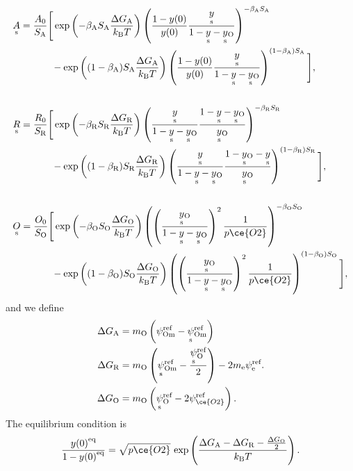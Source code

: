 \documentclass{article}
\numberwithin{equation}{section}
\newcommand{\us}[1]{\underset{\textrm{s}}{#1}{}}
\def\kB{k_\mathrm{B}}
\def\Ox{\mathrm{O}}
\newcommand{\OO}{{\ce{O2}}}
\def\ys{\us y}
\def\y0{{y(0)}}
\def\yOs{{\us y_\textrm{O}}}
\def\pO2{{p\OO}}
\def\A0{A_0}
\def\R0{R_0}
\def\K0{O_0}
\def\DGA{\Delta G_\textrm{A}  }
\def\DGR{\Delta G_\textrm{R}  }
\def\DGO{\Delta G_\textrm{O}  }
\def\betaA{\beta_\textrm{A}}
\def\betaR{\beta_\textrm{R}}
\def\betaO{\beta_\textrm{O}}
\def\SA{S_\textrm{A}}
\def\SR{S_\textrm{R}}
\def\SO{S_\textrm{O}}
\def\eq{\textrm{eq}}
\def\REF{\textrm{ref}}
\begin{document}
\begin{subequations}
\begin{align}
&\us A
=
\frac{\A0}{\SA}
\Bigg[
	\exp
	\left(
		{-\betaA \SA \frac{\DGA}{\kB T}}
	\right)
	\left(
		\frac{1 - \y0}{\y0}
		\frac{\ys}{1-\ys -\yOs}
	\right)^{-\betaA \SA}
\\ \nonumber
	&\quad \quad \quad \quad	
	-
	\exp
	\left(
		{(1-\betaA) \SA \frac{\DGA}{\kB T}}
	\right)
	\left(
		\frac{1 - \y0 }{\y0}
		\frac{\ys}{1-\ys-\yOs}
	\right)^{(1-\betaA) \SA}
\Bigg],
\\ \nonumber
\\
&\us R
=
\frac{\R0}{\SR}
\Bigg[
	\exp
	\left(
		{-\betaR \SR \frac{\DGR}{\kB T}}
	\right)
	\left(
		\frac{\ys}{1- \ys - \yOs}
		\frac{1 -\ys -\yOs}{\yOs}
	\right)^{-\betaR \SR}
\\ \nonumber
	& \quad \quad \quad \quad	
	-
	\exp
	\left(
		{(1 - \betaR) \SR \frac{\DGR}{\kB T}}
	\right)
	\left(
		\frac{\ys}{1- \ys - \yOs}
		\frac{1-\yOs - \ys}{\yOs}
	\right)^{(1-\betaR) \SR}
\Bigg],
\\ \nonumber
\\
&\us O
=
\frac{\K0}{\SO}
\Bigg[
	\exp
	\left(
		{-\betaO \SO \frac{\DGO}{\kB T}}
	\right)
	\left(
		\left(
			\frac{\yOs}{1-\ys-\yOs}
		\right)^2
		\frac{1}{\pO2}
	\right)^{-\betaO \SO}
\\ \nonumber
	&\quad \quad \quad \quad	
	-
	\exp
	\left(
		{(1-\betaO) \SO \frac{\DGO}{\kB T}}
	\right)
	\left(
		\left(
			\frac{\yOs}{1-\ys-\yOs}
		\right)^2
		\frac{1}{\pO2}
	\right)^{(1 - \betaO) \SO}
\Bigg],
\end{align}
\end{subequations}
and we define
\begin{subequations}
\begin{align}
\DGA
&=
m_\Ox
\left(
	\psi_{\textrm{Om}}^\REF
	-
	\us \psi_{\textrm{Om}}^\REF
\right)
\\
\DGR
&= 
m_\Ox
\left(
	\us \psi_{\textrm{Om}}^\REF
	-
	\frac{\us \psi_{\Ox}^\REF}{2}
\right)
-
2 m_\textrm{e} \psi_{\textrm{e}}^\REF.
\\
\DGO
&= 
m_\Ox
\left(
	\us \psi_{\Ox}^\REF
	-
	2 \psi_{\OO}^\REF
\right).
\end{align}
\end{subequations}
The equilibrium condition is
\begin{subequations}
\begin{align}
\frac{\y0^\eq}{1-\y0^\eq} = \sqrt{\pO2} \ \textrm{exp}
\left(
	\frac{\DGA - \DGR - \frac{\DGO}{2}}{\kB T}
\right).
\end{align}
\end{subequations}
\end{document}
